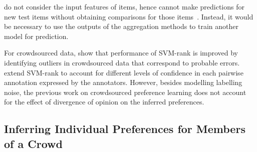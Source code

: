 do not consider the input features of items,
hence cannot make predictions for new test items without obtaining comparisons for those items~\citep{chen2013pairwise,wang2016blind,han2018robust,pan2018stagewise,li2018hybrid}.
Instead, it would be necessary to use the outputs of the aggregation methods to train 
another model for prediction. 

For crowdsourced data, \citet{fu2016robust} show that performance
of SVM-rank is improved by identifying outliers in crowdsourced data
that correspond to probable errors.
\citet{uchida2017entity} extend SVM-rank to account for different levels of confidence in each pairwise annotation expressed
by the annotators.
However, besides modelling labelling noise, 
the previous work on crowdsourced preference learning does not 
account for the effect of divergence of opinion on the inferred preferences.

\subsection{Inferring Individual Preferences for Members of a Crowd}



